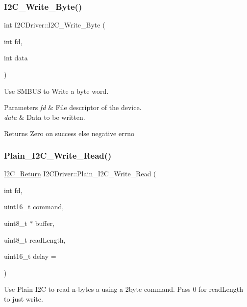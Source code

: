 \subsubsection{\texorpdfstring{I2\+C\+\_\+\+Write\+\_\+\+Byte()}{I2C\_Write\_Byte()}}
{\footnotesize\ttfamily int I2\+C\+Driver\+::\+I2\+C\+\_\+\+Write\+\_\+\+Byte (\begin{DoxyParamCaption}\item[{int}]{fd,  }\item[{int}]{data }\end{DoxyParamCaption})}

Use S\+M\+B\+US to Write a byte word.


\begin{DoxyParams}{Parameters}
{\em fd} & File descriptor of the device. \\
\hline
{\em data} & Data to be written.\\
\hline
\end{DoxyParams}
\begin{DoxyReturn}{Returns}
Zero on success else negative errno 
\end{DoxyReturn}
\mbox{\label{classI2CDriver_a1e025ccfccece30b7d42acd1bf7e8e41}} 
\subsubsection{\texorpdfstring{Plain\+\_\+\+I2\+C\+\_\+\+Write\+\_\+\+Read()}{Plain\_I2C\_Write\_Read()}}
{\footnotesize\ttfamily \hyperlink{I2CDriver_8h_a52c38e7692a76e897b00daa867b29d3f}{I2\+C\+\_\+\+Return} I2\+C\+Driver\+::\+Plain\+\_\+\+I2\+C\+\_\+\+Write\+\_\+\+Read (\begin{DoxyParamCaption}\item[{int}]{fd,  }\item[{uint16\+\_\+t}]{command,  }\item[{uint8\+\_\+t $\ast$}]{buffer,  }\item[{uint8\+\_\+t}]{read\+Length,  }\item[{uint16\+\_\+t}]{delay = {} }\end{DoxyParamCaption})}

Use Plain I2C to read n-\/bytes a using a 2byte command. Pass 0 for read\+Length to just write.


